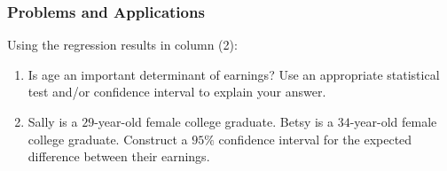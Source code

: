 

\begin{frame}
\frametitle{Problems and Applications}
Using the regression results in column (2):
\begin{enumerate}
\item Is age an important determinant of earnings? Use an appropriate statistical test and/or confidence interval to explain your answer.
\item Sally is a $29$-year-old female college graduate. Betsy is a $34$-year-old female college graduate. Construct a $95\%$ confidence interval for the expected difference between their earnings.
\end{enumerate}
\end{frame}

